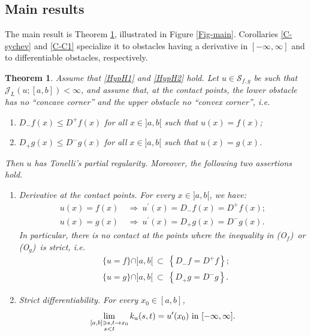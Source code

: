 \documentclass[reqno,12pt]{amsart}
\numberwithin{equation}{section}
\def\J{\mathcal{J}_L}
\def\Sol{\mathcal{S}_{f,g}}
\def\Of{{\sf (O$_f$)}}
\def\Og{{\sf (O$_g$)}}
\newtheorem{theorem}{Theorem}[section]
\theoremstyle{remark}
\begin{document}
\subsection{Main results}\label{Subsect-results}
The main result is Theorem \ref{T-main}, illustrated in Figure \ref{Fig-main}. Corollaries \ref{C-sychev} and \ref{C-C1} specialize it to obstacles having a derivative in $[-\infty,\infty]$ and to differentiable obstacles, respectively.

\begin{theorem}\label{T-main}
Assume that \ref{HypH1} and \ref{HypH2} hold. Let $u\in\Sol$ be such that $\J(u;[a,b])<\infty$, and assume that, at the contact points, the lower obstacle has no ``concave corner'' and the upper obstacle no ``convex corner'', i.e.
\begin{enumerate}[leftmargin=3em, itemsep=0.3em, topsep=0.5em]
\item[\Of] $D_-f(x)\leq D^+f(x)$ for all $x\in]a,b[$ such that $u(x)=f(x)${\rm;}
\item[\Og] $D_+g(x)\leq D^-g(x)$ for all $x\in]a,b[$ such that $u(x)=g(x)$.
\end{enumerate}
Then $u$ has Tonelli's partial regularity. Moreover, the following two assertions hold.
\begin{enumerate}[leftmargin=3em, itemsep=0.8em, topsep=0.5em]
\item[{\rm(i)}] \emph{Derivative at the contact points.} For every $x\in]a,b[$, we have{\rm:}
\begin{equation*}
\begin{aligned}
u(x)=f(x)&\ \Longrightarrow\ u^\prime(x)=D_-f(x)=D^+f(x);\\
u(x)=g(x)&\ \Longrightarrow\ u^\prime(x)=D_+g(x)=D^-g(x).
\end{aligned}
\end{equation*}
In particular, there is no contact at the points where the inequality in \Of\ or \Og\ is strict, i.e.
\begin{align*}
&\{u=f\}\cap]a,b[\ \subset\ \left\{D_-f=D^+f\right\};\\
&\{u=g\}\cap]a,b[\ \subset\ \left\{D_+g=D^-g\right\}.
\end{align*}
\item[{\rm(ii)}] \emph{Strict differentiability.} For every $x_0\in[a,b]$,
\begin{equation*}
\lim_{\substack{[a,b]\ni s,t\to x_0\\ s<t}}k_u(s,t)=u^\prime(x_0)\hbox{ in }[-\infty,\infty].
\end{equation*}
\end{enumerate}
\end{theorem}
\end{document}
